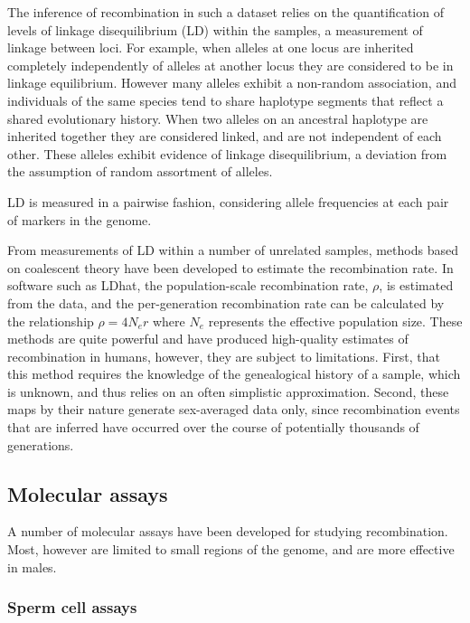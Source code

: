The inference of recombination in such a dataset relies on the quantification of levels of linkage disequilibrium (LD) within the samples, a measurement of linkage between loci.
For example, when alleles at one locus are inherited completely independently of alleles at another locus they are considered to be in linkage equilibrium.
However many alleles exhibit a non-random association, and individuals of the same species tend to share haplotype segments that reflect a shared evolutionary history.
When two alleles on an ancestral haplotype are inherited together they are considered linked, and are not independent of each other.
These alleles exhibit evidence of linkage disequilibrium, a deviation from the assumption of random assortment of alleles.

LD is measured in a pairwise fashion, considering allele frequencies at each pair of markers in the genome.


From measurements of LD within a number of unrelated samples, methods based on coalescent theory have been developed to estimate the recombination rate\cite{Auton2012}.
In software such as LDhat\cite{Mcvean2004,Auton2007,Auton2014}, the population-scale recombination rate, $\rho$, is estimated from the data, and the per-generation recombination rate can be calculated by the relationship
$\rho = 4 N_e r$
where $N_e$ represents the effective population size.
These methods are quite powerful and have produced high-quality estimates of recombination in humans\cite{hapmap2007}, however, they are subject to limitations.
First, that this method requires the knowledge of the genealogical history of a sample, which is unknown, and thus relies on an often simplistic approximation.
Second, these maps by their nature generate sex-averaged data only, since recombination events that are inferred have occurred over the course of potentially thousands of generations.


\subsection{Molecular assays}

A number of molecular assays have been developed for studying recombination.
Most, however are limited to small regions of the genome, and are more effective in males.

\subsubsection{Sperm cell assays}

